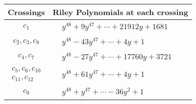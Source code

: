 \documentclass[1p]{elsarticle_modified}
\theoremstyle{definition}
\begin{document}
\begin{tabular}{m{50pt}|m{274pt}}
Crossings & \hspace{64pt}Riley Polynomials at each crossing \\
\hline $$\begin{aligned}c_{1}\end{aligned}$$&$\begin{aligned}
&y^{48}+9 y^{47}+\cdots+21912 y+1681
\end{aligned}$\\
\hline $$\begin{aligned}c_{2},c_{3},c_{8}\end{aligned}$$&$\begin{aligned}
&y^{48}-43 y^{47}+\cdots+4 y+1
\end{aligned}$\\
\hline $$\begin{aligned}c_{4},c_{7}\end{aligned}$$&$\begin{aligned}
&y^{48}-27 y^{47}+\cdots+17760 y+3721
\end{aligned}$\\
\hline $$\begin{aligned}c_{5},c_{6},c_{10}\\c_{11},c_{12}\end{aligned}$$&$\begin{aligned}
&y^{48}+61 y^{47}+\cdots+4 y+1
\end{aligned}$\\
\hline $$\begin{aligned}c_{9}\end{aligned}$$&$\begin{aligned}
&y^{48}+y^{47}+\cdots-36 y^2+1
\end{aligned}$\\
\hline
\end{tabular}
\vskip 2pc
\end{document}
